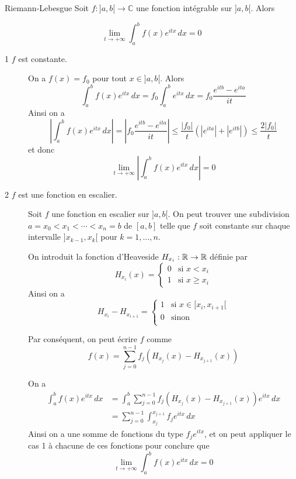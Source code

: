 \documentclass[a4paper, 12pt]{article}
\renewcommand*{\today}{26 March 2026}
\begin{document}
\hotbox{Analyse 4}{CM 13}{\today}

\begin{lemme}{Riemann-Lebesgue}{}
    Soit $f : ]a, b[ \to \mathbb{C}$ une fonction intégrable sur $]a, b[$. Alors

    $$
    \lim_{t \to +\infty} \int_a^b f(x) e^{i t x} \, dx = 0
    $$
\end{lemme}

\begin{demonstration}
    \begin{description}
        \item[1 $f$ est constante.]
        On a $f(x) = f_0$ pour tout $x \in ]a, b[$. Alors
        $$
        \int_a^b f(x) e^{i t x} \, dx = f_0 \int_a^b e^{i t x} \, dx = f_0 \frac{e^{i t b} - e^{i t a}}{i t}
        $$
        Ainsi on a
        $$
        \left| \int_a^b f(x) e^{i t x} \, dx \right| = \left| f_0 \frac{e^{i t b} - e^{i t a}}{i t} \right| \leq  \frac{|f_0|}{t} (|e^{i t a}| + |e^{i t b}|) \leq \frac{2 |f_0|}{t}
        $$
        et donc
        $$
        \lim_{t \to +\infty} \left| \int_a^b f(x) e^{i t x} \, dx \right| = 0
        $$

        \item[2 $f$ est une fonction en escalier.]
        Soit $f$ une fonction en escalier sur $]a, b[$. On peut trouver une subdivision $a = x_0 < x_1 < \cdots < x_n = b$ de $[a, b]$ telle que $f$ soit constante sur chaque intervalle $]x_{k-1}, x_k[$ pour $k = 1, \ldots, n$.

        On introduit la fonction d'Heaveside $H_{x_i} : \mathbb{R} \to \mathbb{R}$ définie par
        $$
        H_{x_i}(x) = \begin{cases}
        0 & \text{si } x < x_i \\
        1 & \text{si } x \geq x_i
        \end{cases}
        $$
        Ainsi on a
        $$
        H_{x_i} - H_{x_{i+1}} = \begin{cases}
            1 & \text{si } x \in [x_i, x_{i+1}[ \\
            0 & \text{sinon } \\
        \end{cases} 
        $$

        Par conséquent, on peut écrire $f$ comme
        $$
        f(x) = \sum_{j=0}^{n-1} f_j(H_{x_j}(x) - H_{x_{j+1}}(x))
        $$

        On a
        \begin{align*}
            \int_a^b f(x) e^{i t x} \, dx &= \int_a^b \sum_{j=0}^{n-1} f_j(H_{x_j}(x) - H_{x_{j+1}}(x)) e^{i t x} \, dx \\
            &= \sum_{j=0}^{n-1} \int_{x_j}^{x_{j+1}} f_j e^{i t x} \, dx
        \end{align*}
        Ainsi on a une somme de fonctions du type $f_j e^{i t x}$, et on peut appliquer le cas 1 à chacune de ces fonctions pour conclure que
        $$
        \lim_{t \to +\infty} \int_a^b f(x) e^{i t x} \, dx = 0
        $$


\end{description}
\end{demonstration}
\end{document}

